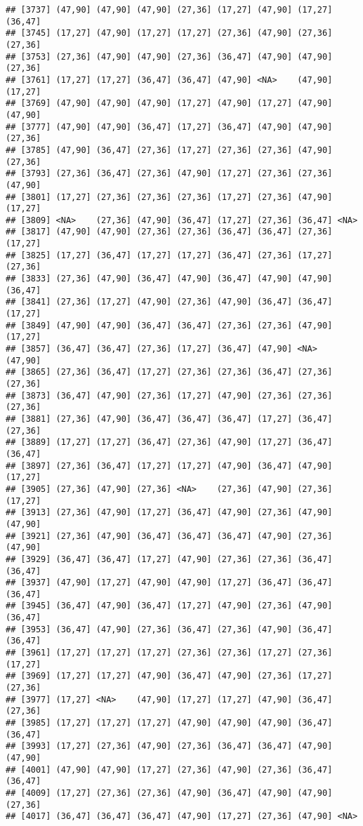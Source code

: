 \documentclass[12pt,]{article}
\begin{document}
\begin{verbatim}
## [3737] (47,90] (47,90] (47,90] (27,36] (17,27] (47,90] (17,27] (36,47]
## [3745] (17,27] (47,90] (17,27] (17,27] (27,36] (47,90] (27,36] (27,36]
## [3753] (27,36] (47,90] (47,90] (27,36] (36,47] (47,90] (47,90] (27,36]
## [3761] (17,27] (17,27] (36,47] (36,47] (47,90] <NA>    (47,90] (17,27]
## [3769] (47,90] (47,90] (47,90] (17,27] (47,90] (17,27] (47,90] (47,90]
## [3777] (47,90] (47,90] (36,47] (17,27] (36,47] (47,90] (47,90] (27,36]
## [3785] (47,90] (36,47] (27,36] (17,27] (27,36] (27,36] (47,90] (27,36]
## [3793] (27,36] (36,47] (27,36] (47,90] (17,27] (27,36] (27,36] (47,90]
## [3801] (17,27] (27,36] (27,36] (27,36] (17,27] (27,36] (47,90] (17,27]
## [3809] <NA>    (27,36] (47,90] (36,47] (17,27] (27,36] (36,47] <NA>   
## [3817] (47,90] (47,90] (27,36] (27,36] (36,47] (36,47] (27,36] (17,27]
## [3825] (17,27] (36,47] (17,27] (17,27] (36,47] (27,36] (17,27] (27,36]
## [3833] (27,36] (47,90] (36,47] (47,90] (36,47] (47,90] (47,90] (36,47]
## [3841] (27,36] (17,27] (47,90] (27,36] (47,90] (36,47] (36,47] (17,27]
## [3849] (47,90] (47,90] (36,47] (36,47] (27,36] (27,36] (47,90] (17,27]
## [3857] (36,47] (36,47] (27,36] (17,27] (36,47] (47,90] <NA>    (47,90]
## [3865] (27,36] (36,47] (17,27] (27,36] (27,36] (36,47] (27,36] (27,36]
## [3873] (36,47] (47,90] (27,36] (17,27] (47,90] (27,36] (27,36] (27,36]
## [3881] (27,36] (47,90] (36,47] (36,47] (36,47] (17,27] (36,47] (27,36]
## [3889] (17,27] (17,27] (36,47] (27,36] (47,90] (17,27] (36,47] (36,47]
## [3897] (27,36] (36,47] (17,27] (17,27] (47,90] (36,47] (47,90] (17,27]
## [3905] (27,36] (47,90] (27,36] <NA>    (27,36] (47,90] (27,36] (17,27]
## [3913] (27,36] (47,90] (17,27] (36,47] (47,90] (27,36] (47,90] (47,90]
## [3921] (27,36] (47,90] (36,47] (36,47] (36,47] (47,90] (27,36] (47,90]
## [3929] (36,47] (36,47] (17,27] (47,90] (27,36] (27,36] (36,47] (36,47]
## [3937] (47,90] (17,27] (47,90] (47,90] (17,27] (36,47] (36,47] (36,47]
## [3945] (36,47] (47,90] (36,47] (17,27] (47,90] (27,36] (47,90] (36,47]
## [3953] (36,47] (47,90] (27,36] (36,47] (27,36] (47,90] (36,47] (36,47]
## [3961] (17,27] (17,27] (17,27] (27,36] (27,36] (17,27] (27,36] (17,27]
## [3969] (17,27] (17,27] (47,90] (36,47] (47,90] (27,36] (17,27] (27,36]
## [3977] (17,27] <NA>    (47,90] (17,27] (17,27] (47,90] (36,47] (27,36]
## [3985] (17,27] (17,27] (17,27] (47,90] (47,90] (47,90] (36,47] (36,47]
## [3993] (17,27] (27,36] (47,90] (27,36] (36,47] (36,47] (47,90] (47,90]
## [4001] (47,90] (47,90] (17,27] (27,36] (47,90] (27,36] (36,47] (36,47]
## [4009] (17,27] (27,36] (27,36] (47,90] (36,47] (47,90] (47,90] (27,36]
## [4017] (36,47] (36,47] (36,47] (47,90] (17,27] (27,36] (47,90] <NA>   

\end{verbatim}
\end{document}
